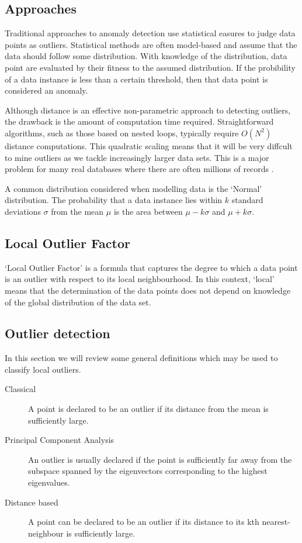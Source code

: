 \subsection{Approaches}
Traditional approaches to anomaly detection use statistical easures to judge 
data points as outliers. Statistical methods are often model-based and assume 
that the data should follow some distribution. With knowledge of the 
distribution, data point are evaluated by their fitness to the assumed 
distribution. If the probibility of a data instance is less than a certain 
threshold, then that data point is considered an anomaly.

Although distance is an effective non-parametric approach to detecting outliers,
the drawback is the amount of computation time required. Straightforward 
algorithms, such as those based on nested loops, typically require $O(N^{2})$
distance computations. This quadratic scaling means that it will be very 
diffcult to mine outliers as we tackle increasingly larger data sets. This is a 
major problem for many real databases where there are often millions of records 
\cite{Bay:2003}.

A common distribution considered when modelling data is the `Normal' 
distribution. The probability that a data instance lies within $k$ standard 
deviations $\sigma$ from the mean $\mu$ is the area between $\mu - k\sigma$ and 
$\mu + k\sigma$.

\subsection{Local Outlier Factor}
\label{sec:localOutlierFactor}
`Local Outlier Factor' is a formula that captures the degree to which a data 
point is an outlier with respect to its local neighbourhood. In this context,
`local' means that the determination of the data points does not depend on 
knowledge of the global distribution of the data set.

\subsection{Outlier detection}
\label{sec:outlierDetection}
In this section we will review some general definitions which may be used to 
classify local outliers.

\begin{description}

\item[Classical] A point is declared to be an outlier if its distance from the 
mean is sufficiently large.
\item[Principal Component Analysis] An outlier is usually declared if the point 
is sufficiently far away from the subspace spanned by the eigenvectors 
corresponding to the highest eigenvalues.
\item[Distance based] A point can be declared to be an outlier if its distance 
to its kth nearest-neighbour is sufficiently large.

\end{description}


